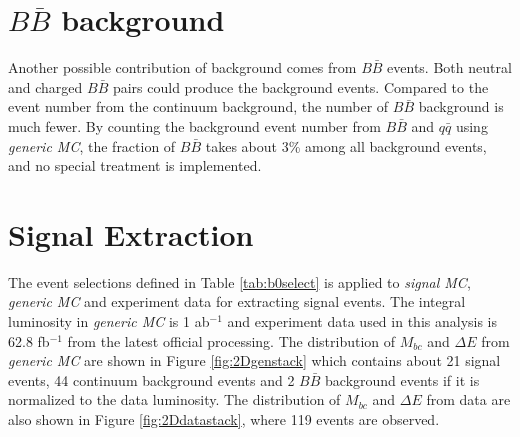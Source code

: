 \section{$B\bar{B}$ background}
Another possible contribution of background comes from $B\bar{B}$ events. Both neutral and charged $B\bar{B}$ pairs could produce the background events. Compared to the event number from the continuum background, the number of $B\bar{B}$ background is much fewer. By counting the background event number from $B\bar{B}$ and $q\bar{q}$ using \textit{generic MC}, the fraction of $B\bar{B}$ takes about 3\% among all background events, and no special treatment is implemented. 

\section{Signal Extraction}
The event selections defined in Table \ref{tab:b0select} is applied to \textit{signal MC}, \textit{generic MC} and experiment data for extracting signal events. The integral luminosity in \textit{generic MC} is 1 ab$^{-1}$ and experiment data used in this analysis is 62.8 fb$^{-1}$ from the latest official processing. The distribution of $M_{bc}$ and $\Delta E$ from \textit{generic MC} are shown in Figure \ref{fig:2Dgenstack} which contains about 21 signal events, 44 continuum background events and 2 $B\bar{B}$ background events if it is normalized to the data luminosity. The distribution of $M_{bc}$ and $\Delta E$ from data are also shown in Figure \ref{fig:2Ddatastack}, where 119 events are observed.

